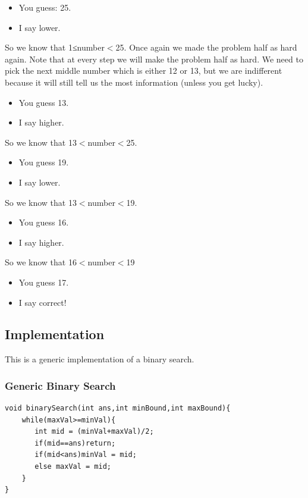 \documentclass[11pt,oneside]{book}
\begin{document}
\begin{itemize}
\item You guess: 25.
\item I say lower.
\end{itemize}

So we know that 1≤number$<$25. Once again we made the problem half as hard again. Note that at every step we will make the problem half as hard. We need to pick the next middle number which is either 12 or 13, but we are indifferent because it will still tell us the most information (unless you get lucky).

\begin{itemize}
\item You guess 13.
\item I say higher.
\end{itemize}

So we know that 13$<$number$<$25.

\begin{itemize}
\item You guess 19.
\item I say lower.
\end{itemize}

So we know that 13$<$number$<$19.

\begin{itemize}
\item You guess 16.
\item I say higher.
\end{itemize}

So we know that 16$<$number$<$19

\begin{itemize}
\item You guess 17.
\item I say correct!
\end{itemize}

\subsection{Implementation}

This is a generic implementation of a binary search.

\subsubsection{Generic Binary Search}

\begin{lstlisting}
void binarySearch(int ans,int minBound,int maxBound){
    while(maxVal>=minVal){
       int mid = (minVal+maxVal)/2;
       if(mid==ans)return;
       if(mid<ans)minVal = mid;
       else maxVal = mid;
    }
}
\end{lstlisting}
\end{document}
